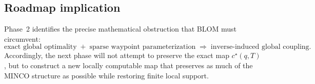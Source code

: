 \subsection{Roadmap implication}
\label{subsec:phase2_roadmap_implication}

Phase~2 identifies the precise mathematical obstruction that BLOM must circumvent:
\[
\boxed{
\text{exact global optimality}
\;+\;
\text{sparse waypoint parameterization}
\;\Longrightarrow\;
\text{inverse-induced global coupling}.
}
\]
Accordingly, the next phase will not attempt to preserve the exact map \(c^\star(q,T)\), but to construct a new locally computable map that preserves as much of the MINCO structure as possible while restoring finite local support.